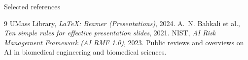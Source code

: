 \documentclass[aspectratio=169]{beamer}
\begin{document}
\begin{frame}[allowframebreaks]{Selected references}
\footnotesize
\begin{thebibliography}{9}
    UMass Library, \emph{LaTeX: Beamer (Presentations)}, 2024.
    A.~N. Bahkali et al., \emph{Ten simple rules for effective presentation slides}, 2021.
      NIST, \emph{AI Risk Management Framework (AI RMF 1.0)}, 2023.
    Public reviews and overviews on AI in biomedical engineering and biomedical sciences.
\end{thebibliography}
\end{frame}
\end{document}

